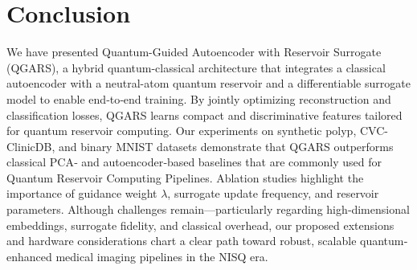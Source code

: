 \documentclass[conference]{IEEEtran}
\begin{document}
\section{Conclusion}

We have presented Quantum-Guided Autoencoder with Reservoir Surrogate (QGARS), a hybrid quantum-classical architecture that integrates a classical autoencoder with a neutral-atom quantum reservoir and a differentiable surrogate model to enable end‐to‐end training. By jointly optimizing reconstruction and classification losses, QGARS learns compact and discriminative features tailored for quantum reservoir computing. Our experiments on synthetic polyp, CVC-ClinicDB, and binary MNIST datasets demonstrate that QGARS outperforms classical PCA‐ and autoencoder‐based baselines that are commonly used for Quantum Reservoir Computing Pipelines. Ablation studies highlight the importance of guidance weight \(\lambda\), surrogate update frequency, and reservoir parameters. Although challenges remain—particularly regarding high‐dimensional embeddings, surrogate fidelity, and classical overhead, our proposed extensions and hardware considerations chart a clear path toward robust, scalable quantum‐enhanced medical imaging pipelines in the NISQ era.




\end{document}
